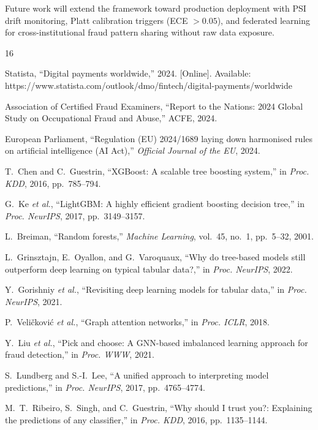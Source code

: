 \documentclass[10pt,a4paper,twocolumn]{article}
\begin{document}
Future work will extend the framework toward production deployment with PSI drift monitoring, Platt calibration triggers (ECE $> 0.05$), and federated learning for cross-institutional fraud pattern sharing without raw data exposure.

\balance
{\small
\begin{thebibliography}{16}

Statista, ``Digital payments worldwide,'' 2024. [Online]. Available: https://www.statista.com/outlook/dmo/fintech/digital-payments/worldwide

Association of Certified Fraud Examiners, ``Report to the Nations: 2024 Global Study on Occupational Fraud and Abuse,'' ACFE, 2024.

European Parliament, ``Regulation (EU) 2024/1689 laying down harmonised rules on artificial intelligence (AI Act),'' \textit{Official Journal of the EU}, 2024.

T.~Chen and C.~Guestrin, ``XGBoost: A scalable tree boosting system,'' in \textit{Proc. KDD}, 2016, pp.~785--794.

G.~Ke \textit{et al.}, ``LightGBM: A highly efficient gradient boosting decision tree,'' in \textit{Proc. NeurIPS}, 2017, pp.~3149--3157.

L.~Breiman, ``Random forests,'' \textit{Machine Learning}, vol.~45, no.~1, pp.~5--32, 2001.

L.~Grinsztajn, E.~Oyallon, and G.~Varoquaux, ``Why do tree-based models still outperform deep learning on typical tabular data?,'' in \textit{Proc. NeurIPS}, 2022.

Y.~Gorishniy \textit{et al.}, ``Revisiting deep learning models for tabular data,'' in \textit{Proc. NeurIPS}, 2021.

P.~Veli{\v{c}}kovi{\'c} \textit{et al.}, ``Graph attention networks,'' in \textit{Proc. ICLR}, 2018.

Y.~Liu \textit{et al.}, ``Pick and choose: A GNN-based imbalanced learning approach for fraud detection,'' in \textit{Proc. WWW}, 2021.

S.~Lundberg and S.-I.~Lee, ``A unified approach to interpreting model predictions,'' in \textit{Proc. NeurIPS}, 2017, pp.~4765--4774.

M.~T.~Ribeiro, S.~Singh, and C.~Guestrin, ``Why should I trust you?: Explaining the predictions of any classifier,'' in \textit{Proc. KDD}, 2016, pp.~1135--1144.


\end{thebibliography}}
\end{document}
